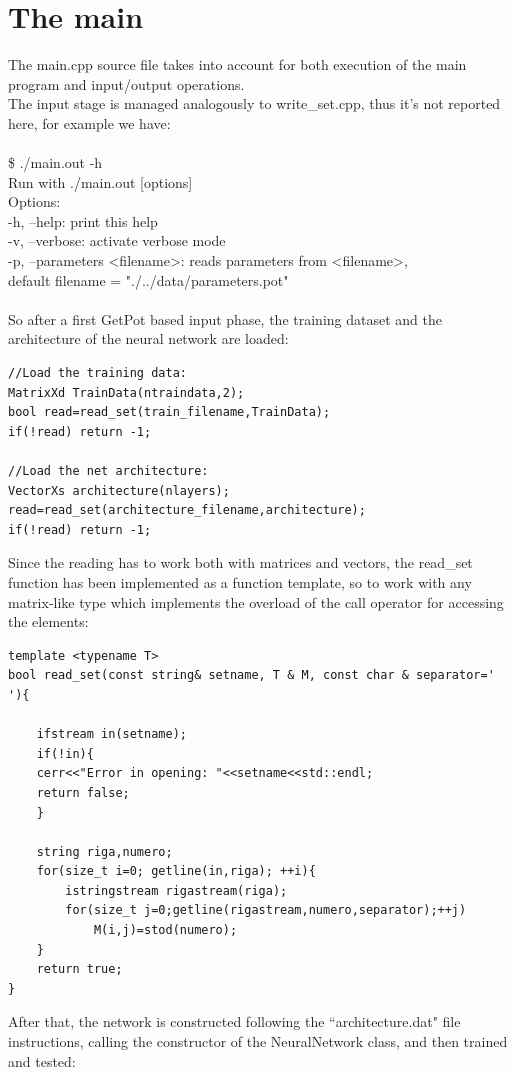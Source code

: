 \documentclass[12pt, a4paper]{report}
\theoremstyle{definition}
\begin{document}
\section{The main}
The {\ttfamily main.cpp} source file takes into account for both execution of the main program and input/output operations.\\
The input stage is managed analogously to {\ttfamily write\_set.cpp}, thus it's not reported here, for example we have:\\
{\\ \ttfamily 
	\$ ./main.out -h\\
	Run with ./main.out [options]\\
	Options:\\
	-h, --help: print this help\\
	-v, --verbose: activate verbose mode\\
	-p, --parameters <filename>: reads parameters from <filename>,\\
	default filename = "./../data/parameters.pot"\\
	 \\}
So after a first GetPot based input phase, the training dataset and the architecture of the neural network are loaded:
\begin{lstlisting}[frame=single]
//Load the training data:
MatrixXd TrainData(ntraindata,2);
bool read=read_set(train_filename,TrainData);
if(!read) return -1;

//Load the net architecture:
VectorXs architecture(nlayers);
read=read_set(architecture_filename,architecture);
if(!read) return -1;
\end{lstlisting}
Since the reading has to work both with matrices and vectors, the read\_set function has been implemented as a function template, so to work with any matrix-like type which implements the overload of the call operator for accessing the elements:
\begin{lstlisting}[frame=single, showstringspaces=false]
template <typename T> 
bool read_set(const string& setname, T & M, const char & separator=' '){

	ifstream in(setname);
	if(!in){
	cerr<<"Error in opening: "<<setname<<std::endl;
	return false;
	}

	string riga,numero;
	for(size_t i=0; getline(in,riga); ++i){
		istringstream rigastream(riga);
		for(size_t j=0;getline(rigastream,numero,separator);++j)
			M(i,j)=stod(numero);
	}
	return true;
}
\end{lstlisting}
After that, the network is constructed following the ``architecture.dat" file instructions, calling the constructor of the NeuralNetwork class, and then trained and tested:
\end{document}
